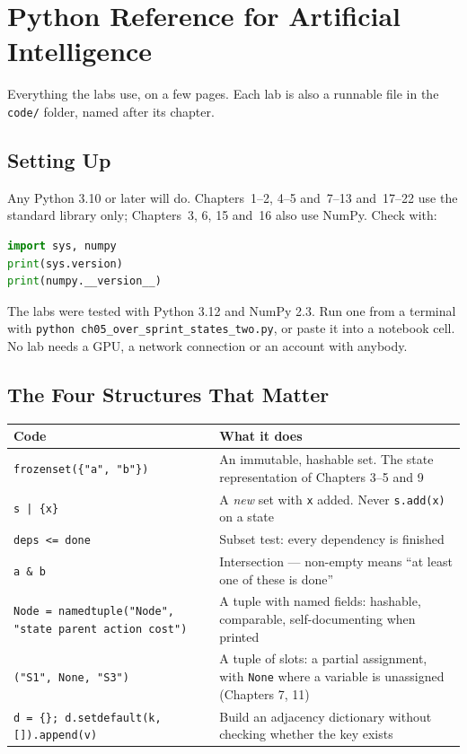 \chapter{Python Reference for Artificial Intelligence}\label{app:python}
\normalfigures

Everything the labs use, on a few pages. Each lab is also a runnable file in the
\texttt{code/} folder, named after its chapter.

\section{Setting Up}

Any Python 3.10 or later will do. Chapters~1--2, 4--5 and~7--13 and~17--22 use the
standard library only; Chapters~3, 6, 15 and~16 also use NumPy. Check with:
\begin{lstlisting}[language=Python]
import sys, numpy
print(sys.version)
print(numpy.__version__)
\end{lstlisting}
The labs were tested with Python 3.12 and NumPy 2.3. Run one from a terminal with
\texttt{python ch05\_over\_sprint\_states\_two.py}, or paste it into a notebook
cell. No lab needs a GPU, a network connection or an account with anybody.

\section{The Four Structures That Matter}

\begin{longtable}{@{}L{6.0cm}L{9.0cm}@{}}
\toprule
{}
\textbf{Code} & \textbf{What it does} \\
\midrule
\endhead
\texttt{frozenset(\{"a", "b"\})} & An immutable, hashable set. The state
representation of Chapters 3--5 and 9 \\
\texttt{s | \{x\}} & A \emph{new} set with \texttt{x} added. Never
\texttt{s.add(x)} on a state \\
\texttt{deps <= done} & Subset test: every dependency is finished \\
\texttt{a \& b} & Intersection --- non-empty means ``at least one of these is
done'' \\
\texttt{Node = namedtuple("Node", "state parent action cost")} & A tuple with
named fields: hashable, comparable, self-documenting when printed \\
\texttt{("S1", None, "S3")} & A tuple of slots: a partial assignment, with
\texttt{None} where a variable is unassigned (Chapters 7, 11) \\
\texttt{d = \{\}; d.setdefault(k, []).append(v)} & Build an adjacency dictionary
without checking whether the key exists \\
\bottomrule
\end{longtable}

